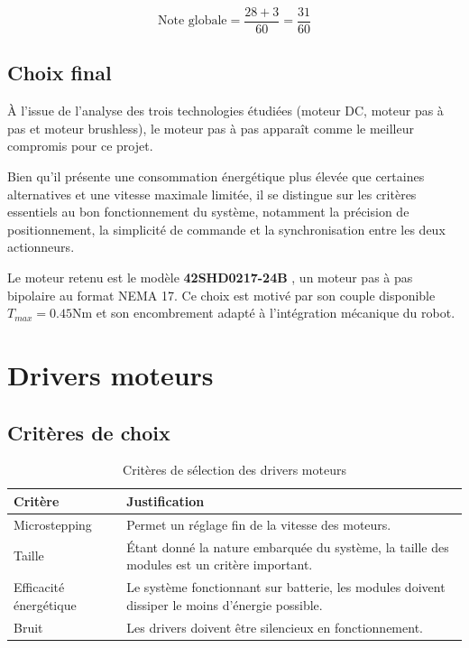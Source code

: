 $$
\text{Note globale}=\frac{28+3}{60}=\frac{31}{60}
$$

\subsection{Choix final}

À l'issue de l'analyse des trois technologies étudiées (moteur DC, moteur pas à pas et moteur brushless), le moteur pas à pas apparaît comme le meilleur compromis pour ce projet.

Bien qu'il présente une consommation énergétique plus élevée que certaines alternatives et une vitesse maximale limitée, il se distingue sur les critères essentiels au bon fonctionnement du système, notamment la précision de positionnement, la simplicité de commande et la synchronisation entre les deux actionneurs.

Le moteur retenu est le modèle \textbf{42SHD0217-24B} \cite{42SHD0217_datasheet}, un moteur pas à pas bipolaire au format NEMA 17. Ce choix est motivé par son couple disponible $T_{max} = 0.45 \si{\newton\meter}$ et son encombrement adapté à l'intégration mécanique du robot.

\section{Drivers moteurs}
\subsection{Critères de choix}
\begin{table}[H]
    \centering
    \begin{tabular}{|l|p{8cm}|}
        \hline
        \textbf{Critère} & \textbf{Justification} \\
        \hline
        Microstepping & Permet un réglage fin de la vitesse des moteurs. \\
        \hline
        Taille & Étant donné la nature embarquée du système, la taille des modules est un critère important. \\
        \hline
        Efficacité énergétique & Le système fonctionnant sur batterie, les modules doivent dissiper le moins d'énergie possible. \\
        \hline
        Bruit & Les drivers doivent être silencieux en fonctionnement. \\
        \hline
    \end{tabular}
    \caption{Critères de sélection des drivers moteurs}
    \label{tab:criteres_drivers}
\end{table}

